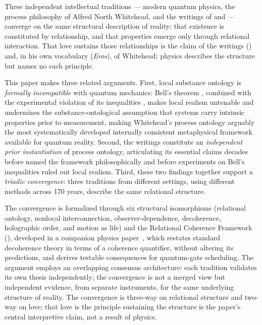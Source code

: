 
Three independent intellectual traditions --- modern quantum physics, the
process philosophy of Alfred North Whitehead, and the \bahai writings of
\Bahaullah and \AbdulBaha --- converge on the same structural
description of reality: that existence is constituted by relationship, and
that properties emerge only through relational interaction.
That love sustains those relationships is the claim of the \bahai writings
(\mahabbat) and, in his own vocabulary (\emph{Eros}), of Whitehead; physics
describes the structure but names no such principle.

This paper makes three related arguments.
First, local substance ontology is \emph{formally incompatible} with quantum mechanics:
Bell's theorem \citep{Bell1964}, combined with the experimental violation of
its inequalities \citep{Aspect1982,Hensen2015}, makes local realism untenable
and undermines the substance-ontological assumption that systems carry
intrinsic properties prior to measurement, making Whitehead's process ontology
arguably the most systematically developed internally consistent metaphysical
framework available for quantum reality.
Second, the \bahai writings constitute an \emph{independent prior instantiation}
of process ontology, articulating its essential claims decades before
\citet{Whitehead1929} named the framework philosophically and before
experiments on Bell's inequalities ruled out local realism.
Third, these two findings together support a \emph{triadic convergence}:
three traditions from different settings, using different methods across
170 years, describe the same relational structure.

The convergence is formalized through six structural isomorphisms (relational
ontology, nonlocal interconnection, observer-dependence, decoherence, holographic
order, and motion as life) and the Relational Coherence Framework (\RCF),
developed in a companion physics paper~\citep{Adams2026Physics}, which restates
standard decoherence theory in terms of a coherence quantifier, without
altering its predictions, and derives testable consequences for quantum-gate
scheduling.
The argument employs an overlapping consensus architecture: each tradition
validates its own thesis independently; the convergence is not a merged view
but independent evidence, from separate instruments, for the same underlying
structure of reality.
The convergence is three-way on relational structure and two-way on love;
that love is the principle sustaining the structure is the paper's central
interpretive claim, not a result of physics.
